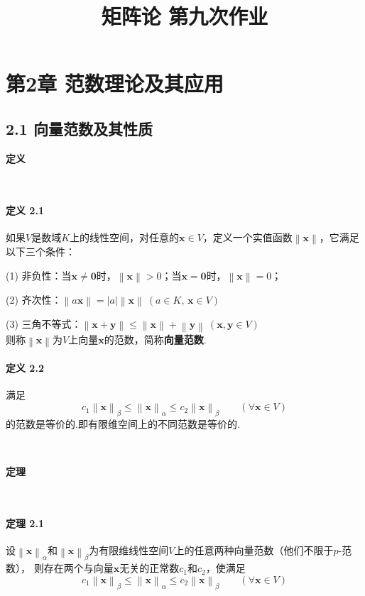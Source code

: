 \documentclass[12pt, a4paper, oneside, fontset=none]{ctexart}
\author{}
\date{}
\title{\vspace{-3em}\textbf{矩阵论 \quad 第九次作业}\vspace{-3em}}
\begin{document}
\maketitle

\section*{第2章 \quad 范数理论及其应用}

\subsection*{2.1 \quad 向量范数及其性质}

\centerline{\large{\textbf{定义}}} \ \par

\paragraph*{定义 2.1} 如果$V$是数域$K$上的线性空间，对任意的$\bm{x}\in V$，定义一个实值函数$\left\lVert \bm{x}\right\rVert $，它满足
以下三个条件：\par
(1) 非负性：当$\bm{x} \neq \bm{0}$时，$\left\lVert \bm{x} \right\rVert > 0$；当$\bm{x} = \bm{0}$时，$\left\lVert \bm{x} \right\rVert = 0$；\par
(2) 齐次性：$\left\lVert a\bm{x} \right\rVert = \left\lvert a\right\rvert \left\lVert \bm{x} \right\rVert\ (a\in K,\, \bm{x} \in V)$ \par
(3) 三角不等式：$\left\lVert \bm{x} + \bm{y} \right\rVert \leqslant \left\lVert \bm{x} \right\rVert + \left\lVert \bm{y} \right\rVert\ (\bm{x},\bm{y} \in V)$ \\
则称$\left\lVert \bm{x} \right\rVert$为$V$上向量$\bm{x}$的范数，简称\textbf{向量范数}.

\paragraph*{定义 2.2} 满足
\[
    c_1\left\lVert \bm{x} \right\rVert _\beta \leqslant \left\lVert \bm{x} \right\rVert _\alpha \leqslant c_2 \left\lVert \bm{x} \right\rVert _\beta \qquad (\forall \bm{x} \in V)
\]
的范数是等价的.即有限维空间上的不同范数是等价的.

\par \ \par

\centerline{\large{\textbf{定理}}} \ \par

\paragraph*{定理 2.1} 设$\left\lVert \bm{x}\right\rVert _\alpha$和$\left\lVert \bm{x} \right\rVert _\beta$为有限维线性空间$V$上的任意两种向量范数（他们不限于$p$-范数），
则存在两个与向量$\bm{x}$无关的正常数$c_1$和$c_2$，使满足
\[
    c_1\left\lVert \bm{x} \right\rVert _\beta \leqslant \left\lVert \bm{x} \right\rVert _\alpha \leqslant c_2 \left\lVert \bm{x} \right\rVert _\beta \qquad (\forall \bm{x} \in V)
\]
\end{document}
